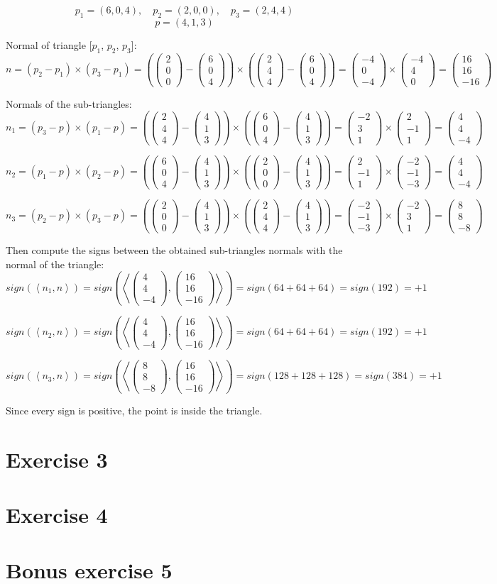 \documentclass[tikz,14pt,fleqn]{article}
\newcommand{\pvec}[3]{
   \ensuremath{
   \begin{pmatrix}
       #1 \\
       #2 \\
       #3
   \end{pmatrix}
}}
\newcommand{\dotproduct}[2]{\ensuremath{\left< #1, #2 \right>}}
\begin{document}
\[
   p_1 = (6, 0, 4),\quad p_2 = (2, 0, 0),\quad p_3 = (2, 4, 4)
\]
\[
   p = (4, 1, 3)
\]

Normal of triangle [$p_1$, $p_2$, $p_3$]:
\[
   n = (p_2 - p_1) \times (p_3 - p_1) = 
   \left(
   \pvec{2}{0}{0} - \pvec{6}{0}{4}
   \right)
   \times
   \left(
   \pvec{2}{4}{4} - \pvec{6}{0}{4}
   \right) =
   \pvec{-4}{0}{-4}
   \times
   \pvec{-4}{4}{0}
   =
   \pvec{16}{16}{-16}
\]


Normals of the sub-triangles:
\[
   n_1 = (p_3 - p) \times (p_1 - p) =
   \left(
   \pvec{2}{4}{4} - \pvec{4}{1}{3}
   \right)
   \times
   \left(
   \pvec{6}{0}{4} - \pvec{4}{1}{3}
   \right) =
   \pvec{-2}{3}{1}
   \times
   \pvec{2}{-1}{1}
   =
   \pvec{4}{4}{-4}
\]



\[
   n_2 = (p_1 - p) \times (p_2 - p) =
   \left(
   \pvec{6}{0}{4} - \pvec{4}{1}{3}
   \right)
   \times
   \left(
   \pvec{2}{0}{0} - \pvec{4}{1}{3}
   \right) =
   \pvec{2}{-1}{1}
   \times
   \pvec{-2}{-1}{-3}
   =
   \pvec{4}{4}{-4}
\]


\[
  n_3 = (p_2 - p) \times (p_3 - p) =
   \left(
   \pvec{2}{0}{0} - \pvec{4}{1}{3}
   \right)
   \times 
   \left(
   \pvec{2}{4}{4} - \pvec{4}{1}{3}
   \right) =
   \pvec{-2}{-1}{-3}
   \times
   \pvec{-2}{3}{1}
   =
   \pvec{8}{8}{-8}
\]


Then compute the signs between the obtained sub-triangles normals with the normal of the triangle:
\[
   sign(\dotproduct{n_1}{n}) = 
   sign
   \left(
   \dotproduct{\pvec{4}{4}{-4}}{\pvec{16}{16}{-16}}
   \right) = 
   sign(64 + 64 + 64 ) = sign(192) = +1
\]

\[
   sign(\dotproduct{n_2}{n}) = 
   sign
   \left(
   \dotproduct{\pvec{4}{4}{-4}}{\pvec{16}{16}{-16}}
   \right) = 
   sign(64 +64 +64 ) = sign(192) = +1
\]

\[
   sign(\dotproduct{n_3}{n}) = 
   sign
   \left(
   \dotproduct{\pvec{8}{8}{-8}}{\pvec{16}{16}{-16}}
   \right) = 
   sign(128 +128 +128) = sign(384) = +1
\]

Since every sign is positive, the point is inside the triangle.



\section{Exercise 3}

\section{Exercise 4}

\section{Bonus exercise 5}
\end{document}
